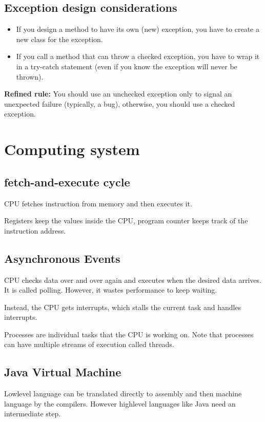 \documentclass[letterpaper,12pt]{article}
\begin{document}
\subsection{Exception design considerations}
\begin{itemize}
      \item If you design a method to have its own (new) exception, you have to create a
            new class for the exception.
      \item If you call a method that can throw a checked exception, you have to wrap it in
            a try-catch statement (even if you know the exception will never be thrown).
\end{itemize}
\textbf{Refined rule: }
You should use an unchecked exception only to signal an unexpected failure (typically, a bug), otherwise, you should use a checked exception.

\section{Computing system}
\subsection{fetch-and-execute cycle}
CPU fetches instruction from memory and then executes it.

Registers keep the values inside the CPU, program counter keeps track of the instruction address.

\subsection{Asynchronous Events}
CPU checks data over and over again and executes when the desired data arrives. It is called polling. However, it wastes performance to keep waiting.

Instead, the CPU gets interrupts, which stalls the current task and handles interrupts.

Processes are individual tasks that the CPU is working on. Note that processes can have multiple streams of execution called threads.

\subsection{Java Virtual Machine}
Low\-level language can be translated directly to assembly and then machine language by the compilers. However high\-level languages like Java need an intermediate step.
\end{document}
